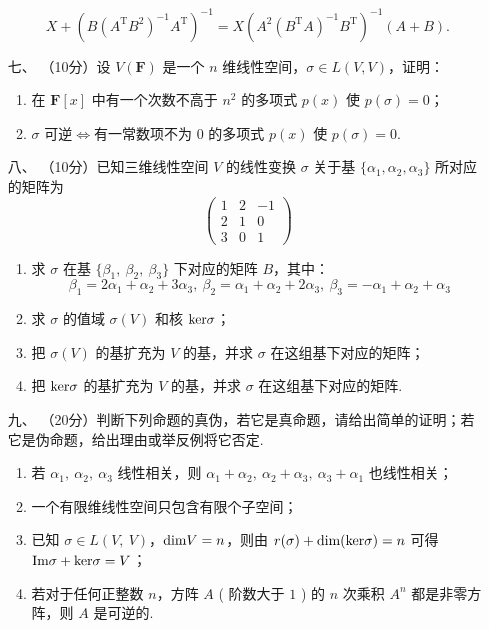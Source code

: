 \begin{enumerate}
    \[X+(B(A^\mathrm{T}B^2)^{-1}A^\mathrm{T})^{-1}=X(A^2(B^\mathrm{T}A)^{-1}B^\mathrm{T})^{-1}(A+B).\]
	\item[七、]（10分）设 $V(\mathbf{F})$ 是一个 $n$ 维线性空间，$\sigma \in L(V,V)$，证明：
    \begin{enumerate}[label=(\arabic*)]
        \item 在 $\mathbf{F}[x]$ 中有一个次数不高于 $n^2$ 的多项式 $p(x)$ 使 $p(\sigma)=0$；
        \item $\sigma$ 可逆$\iff$有一常数项不为 $0$ 的多项式 $p(x)$ 使 $p(\sigma)=0$.
    \end{enumerate}
    \item[八、]（10分）已知三维线性空间 $V$ 的线性变换 $\sigma$ 关于基 $\{\alpha_1,\alpha_2,\alpha_3\}$ 所对应的矩阵为
    \[\begin{pmatrix}1 & 2 & -1 \\ 2 & 1 & 0 \\ 3 & 0 & 1\end{pmatrix}\]
    \begin{enumerate}[label=(\arabic*)]
        \item 求 $\sigma$ 在基 $\{\beta_1,\ \beta_2,\ \beta_3\}$ 下对应的矩阵 $B$，其中：
        \[\beta_1=2\alpha_1+\alpha_2+3\alpha_3,\ \beta_2=\alpha_1+\alpha_2+2\alpha_3,\ \beta_3=-\alpha_1+\alpha_2+\alpha_3\]
        \item 求 $\sigma$ 的值域 $\sigma(V)$ 和核 $\textup{ker}\sigma$；
        \item 把 $\sigma(V)$ 的基扩充为 $V$ 的基，并求 $\sigma$ 在这组基下对应的矩阵；
        \item 把 $\textup{ker}\sigma$ 的基扩充为 $V$ 的基，并求 $\sigma$ 在这组基下对应的矩阵.
    \end{enumerate}
	\item[九、]（20分）判断下列命题的真伪，若它是真命题，请给出简单的证明；若它是伪命题，给出理由或举反例将它否定.
    \begin{enumerate}[label=(\arabic*)]
        \item 若 $\alpha_1,\ \alpha_2,\ \alpha_3$ 线性相关，则 $\alpha_1+\alpha_2,\ \alpha_2+\alpha_3,\ \alpha_3+\alpha_1$ 也线性相关；
        \item 一个有限维线性空间只包含有限个子空间；
        \item 已知 $\sigma \in L(V,\ V)$，$\textup{dim}V=n$，则由 $r(\sigma)+\textup{dim(ker}\sigma)=n$ 可得$\textup{Im}\sigma+\textup{ker}\sigma=V$；
        \item 若对于任何正整数 $n$，方阵 $A$ ( 阶数大于 $1$ ) 的 $n$ 次乘积 $A^n$ 都是非零方阵，则 $A$ 是可逆的.
    \end{enumerate}
\end{enumerate}

\newpage
